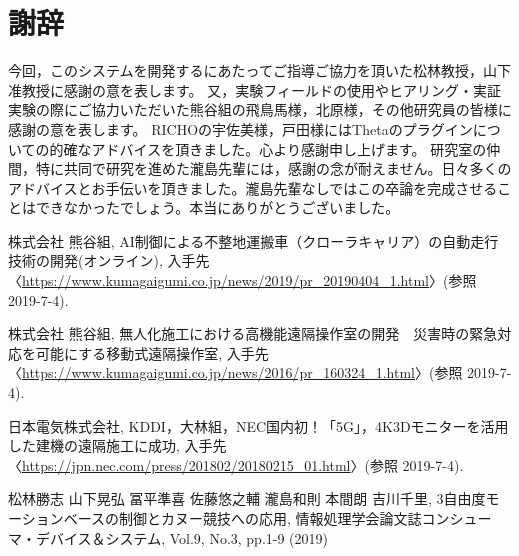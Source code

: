 \documentclass[a4paper,12pt]{jsarticle}
\begin{document}
\section*{謝辞} %
今回，このシステムを開発するにあたってご指導ご協力を頂いた松林教授，山下准教授に感謝の意を表します。
又，実験フィールドの使用やヒアリング・実証実験の際にご協力いただいた熊谷組の飛鳥馬様，北原様，その他研究員の皆様に感謝の意を表します。
RICHOの宇佐美様，戸田様にはThetaのプラグインについての的確なアドバイスを頂きました。心より感謝申し上げます。
研究室の仲間，特に共同で研究を進めた瀧島先輩には，感謝の念が耐えません。日々多くのアドバイスとお手伝いを頂きました。瀧島先輩なしではこの卒論を完成させることはできなかったでしょう。本当にありがとうございました。

\clearpage

\begin{flushleft} %
\begin{thebibliography}{9} %

株式会社 熊谷組, AI制御による不整地運搬車（クローラキャリア）の自動走行技術の開発(オンライン), 入手先〈\url{https://www.kumagaigumi.co.jp/news/2019/pr_20190404_1.html}〉(参照 2019-7-4).

株式会社 熊谷組, 無人化施工における高機能遠隔操作室の開発　災害時の緊急対応を可能にする移動式遠隔操作室, 入手先〈\url{https://www.kumagaigumi.co.jp/news/2016/pr_160324_1.html}〉(参照 2019-7-4).

日本電気株式会社, KDDI，大林組，NEC国内初！「5G」，4K3Dモニターを活用した建機の遠隔施工に成功, 入手先〈\url{https://jpn.nec.com/press/201802/20180215_01.html}〉(参照 2019-7-4).

松林勝志 山下晃弘 冨平準喜 佐藤悠之輔 瀧島和則 本間朗 吉川千里, 3自由度モーションベースの制御とカヌー競技への応用, 情報処理学会論文誌コンシューマ・デバイス＆システム, Vol.9, No.3, pp.1-9 (2019)

\end{thebibliography}
\end{flushleft}
\end{document}
